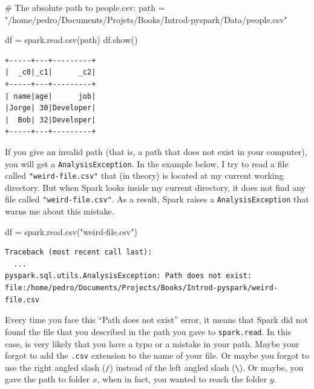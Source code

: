 \documentclass[
  11pt,
  letterpaper,
  DIV=11,
  numbers=noendperiod]{scrreprt}
\newenvironment{Shaded}{\begin{snugshade}}{\end{snugshade}}
\newcommand{\CommentTok}[1]{\textcolor[rgb]{0.37,0.37,0.37}{#1}}
\newcommand{\NormalTok}[1]{\textcolor[rgb]{0.00,0.23,0.31}{#1}}
\newcommand{\OperatorTok}[1]{\textcolor[rgb]{0.37,0.37,0.37}{#1}}
\newcommand{\StringTok}[1]{\textcolor[rgb]{0.13,0.47,0.30}{#1}}
\begin{document}
\begin{Shaded}
\begin{Highlighting}[]
\CommentTok{\# The absolute path to \textasciigrave{}people.csv\textasciigrave{}:}
\NormalTok{path }\OperatorTok{=} \StringTok{"/home/pedro/Documents/Projets/Books/Introd{-}pyspark/Data/people.csv"}

\NormalTok{df }\OperatorTok{=}\NormalTok{ spark.read.csv(path)}
\NormalTok{df.show()}
\end{Highlighting}
\end{Shaded}

\begin{verbatim}
+-----+---+---------+
|  _c0|_c1|      _c2|
+-----+---+---------+
| name|age|      job|
|Jorge| 30|Developer|
|  Bob| 32|Developer|
+-----+---+---------+
\end{verbatim}

If you give an invalid path (that is, a path that does not exist in your
computer), you will get a \texttt{AnalysisException}. In the example
below, I try to read a file called \texttt{"weird-file.csv"} that (in
theory) is located at my current working directory. But when Spark looks
inside my current directory, it does not find any file called
\texttt{"weird-file.csv"}. As a result, Spark raises a
\texttt{AnalysisException} that warns me about this mistake.

\begin{Shaded}
\begin{Highlighting}[]
\NormalTok{df }\OperatorTok{=}\NormalTok{ spark.read.csv(}\StringTok{"weird{-}file.csv"}\NormalTok{)}
\end{Highlighting}
\end{Shaded}

\begin{verbatim}
Traceback (most recent call last):
  ...
pyspark.sql.utils.AnalysisException: Path does not exist: file:/home/pedro/Documents/Projects/Books/Introd-pyspark/weird-file.csv
\end{verbatim}

Every time you face this ``Path does not exist'' error, it means that
Spark did not found the file that you described in the path you gave to
\texttt{spark.read}. In this case, is very likely that you have a typo
or a mistake in your path. Maybe your forgot to add the \texttt{.csv}
extension to the name of your file. Or maybe you forgot to use the right
angled slash (\texttt{/}) instead of the left angled slash
(\texttt{\textbackslash{}}). Or maybe, you gave the path to folder
\(x\), when in fact, you wanted to reach the folder \(y\).
\end{document}
